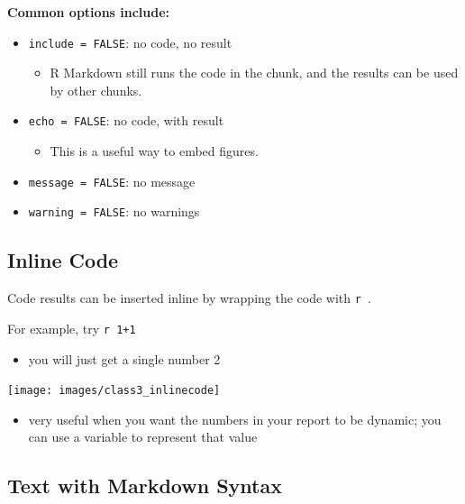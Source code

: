 \documentclass[
  11pt,
]{book}
\providecommand{\tightlist}{%
  \setlength{\itemsep}{0pt}\setlength{\parskip}{0pt}}
\begin{document}
\textbf{Common options include:}

\begin{itemize}
\tightlist
\item
  \texttt{include\ =\ FALSE}: no code, no result

  \begin{itemize}
  \tightlist
  \item
    R Markdown still runs the code in the chunk, and the results can be used by other chunks.
  \end{itemize}
\item
  \texttt{echo\ =\ FALSE}: no code, with result

  \begin{itemize}
  \tightlist
  \item
    This is a useful way to embed figures.
  \end{itemize}
\item
  \texttt{message\ =\ FALSE}: no message
\item
  \texttt{warning\ =\ FALSE}: no warnings
\end{itemize}

\hypertarget{inline-code}{%
\subsection{Inline Code}\label{inline-code}}

Code results can be inserted inline by wrapping the code with \texttt{\textasciigrave{}r\ \textasciigrave{}}.

For example, try \texttt{\textasciigrave{}r\ 1+1\textasciigrave{}}

\begin{itemize}
\tightlist
\item
  you will just get a single number 2
\end{itemize}

\begin{center}\texttt{[image: images/class3\_inlinecode]} \end{center}

\begin{itemize}
\tightlist
\item
  very useful when you want the numbers in your report to be dynamic; you can use a variable to represent that value
\end{itemize}

\hypertarget{text-with-markdown-syntax}{%
\subsection{Text with Markdown Syntax}\label{text-with-markdown-syntax}}
\end{document}
